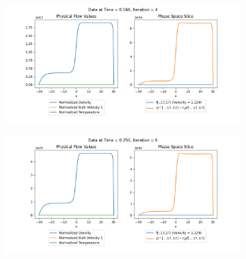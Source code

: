 \documentclass{article}
\begin{document}
\begin{figure}[H]
  \begin{subfigure}[b]{\textwidth}
    \includegraphics[width=\textwidth]{imgs/lf_output2/plots/plot4.png}
  \end{subfigure}
  \hfill
  \begin{subfigure}[b]{\textwidth}
    \includegraphics[width=\textwidth]{imgs/lf_output2/plots/plot6.png}
    \end{subfigure}
\end{figure}
\end{document}
